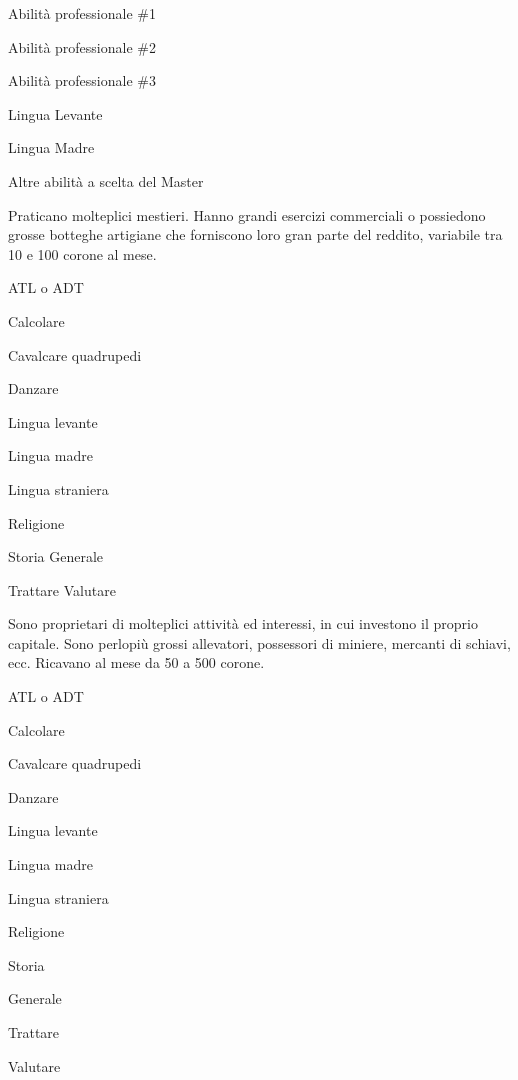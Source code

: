 \begin{abilist}
\item Abilit\`a professionale \#1
\item Abilit\`a professionale \#2
\item Abilit\`a professionale \#3
\item Lingua Levante
\item Lingua Madre
\item Altre abilit\`a a scelta del Master
\end{abilist}


Praticano molteplici mestieri. Hanno grandi esercizi
commerciali o possiedono grosse botteghe artigiane che forniscono loro
gran parte del reddito, variabile tra 10 e 100 corone al mese.

\begin{abilist}
\item ATL o ADT
\item Calcolare
\item Cavalcare quadrupedi
\item Danzare
\item Lingua levante
\item Lingua madre
\item Lingua straniera
\item Religione
\item Storia Generale
\item Trattare Valutare
\end{abilist}


Sono proprietari di molteplici attivit\`a ed interessi, in cui
investono il proprio capitale. Sono perlopi\`u grossi allevatori,
possessori di miniere, mercanti di schiavi, ecc. Ricavano al mese da
50 a 500 corone.

\begin{abilist}
\item ATL o ADT
\item Calcolare
\item Cavalcare quadrupedi
\item Danzare
\item Lingua levante
\item Lingua madre
\item Lingua straniera
\item Religione
\item Storia
\item Generale
\item Trattare 
\item Valutare
\end{abilist}

